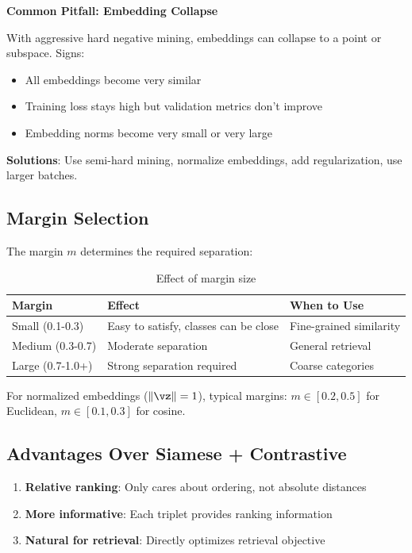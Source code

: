 \begin{warningbox}
\textbf{Common Pitfall: Embedding Collapse}

With aggressive hard negative mining, embeddings can collapse to a point or subspace. Signs:
\begin{itemize}
    \item All embeddings become very similar
    \item Training loss stays high but validation metrics don't improve
    \item Embedding norms become very small or very large
\end{itemize}

\textbf{Solutions}: Use semi-hard mining, normalize embeddings, add regularization, use larger batches.
\end{warningbox}

\subsection{Margin Selection}

The margin $m$ determines the required separation:

\begin{table}[H]
\centering
\caption{Effect of margin size}
\begin{tabularx}{\textwidth}{lXX}
\toprule
\textbf{Margin} & \textbf{Effect} & \textbf{When to Use} \\
\midrule
Small (0.1-0.3) & Easy to satisfy, classes can be close & Fine-grained similarity \\
Medium (0.3-0.7) & Moderate separation & General retrieval \\
Large (0.7-1.0+) & Strong separation required & Coarse categories \\
\bottomrule
\end{tabularx}
\end{table}

For normalized embeddings ($\|\vz\| = 1$), typical margins: $m \in [0.2, 0.5]$ for Euclidean, $m \in [0.1, 0.3]$ for cosine.

\subsection{Advantages Over Siamese + Contrastive}

\begin{enumerate}
    \item \textbf{Relative ranking}: Only cares about ordering, not absolute distances
    \item \textbf{More informative}: Each triplet provides ranking information
    \item \textbf{Natural for retrieval}: Directly optimizes retrieval objective
\end{enumerate}

